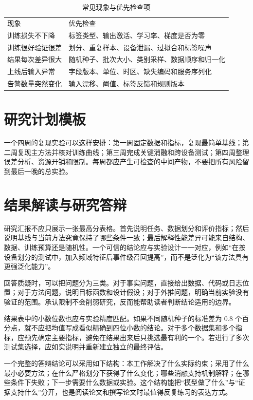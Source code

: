 \begin{table}[htbp]
\centering
\caption{常见现象与优先检查项}
\begin{tabular}{p{}p{}}
\toprule
现象 & 优先检查\\
训练损失不下降 & 标签类型、输出激活、学习率、梯度是否为零\\
训练很好验证很差 & 划分、重复样本、设备泄漏、过拟合和标签噪声\\
结果每次差异很大 & 随机种子、批次大小、类别采样、数据顺序和归一化\\
上线后输入异常 & 字段版本、单位、时区、缺失编码和服务序列化\\
告警数量突然变化 & 输入漂移、阈值、标签反馈和规则版本\\
\bottomrule
\end{tabular}
\end{table}

\section{研究计划模板}
一个四周的复现实验可以这样安排：第一周固定数据和指标，复现最简单基线；第二周复现主方法并核对训练曲线；第三周完成关键消融和跨设备测试；第四周整理误差分析、资源开销和限制。每周都应产生可检查的中间产物，不要把所有风险留到最后一晚的总实验。

\section{结果解读与研究答辩}
研究汇报不应只展示一张最高分表格。首先说明任务、数据划分和评价指标；然后说明基线与当前方法究竟保持了哪些条件一致；最后解释性能差异可能来自结构、数据、训练预算还是随机性。一个可信的结论应与实验设计一一对应，例如“在按设备划分的测试中，加入频域特征后事件级召回提高”，而不是泛化为“该方法具有更强泛化能力”。

回答质疑时，可以把问题分为三类。对于事实问题，直接给出数据、代码或日志位置；对于方法问题，说明目标函数和设计假设；对于外推问题，明确当前实验没有验证的范围。承认限制不会削弱研究，反而能帮助读者判断结论适用的边界。

结果表中的小数位数也应与实验精度匹配。如果不同随机种子的标准差为 $0.8$ 个百分点，就不应把均值写成看似精确到四位小数的结论。对于多个数据集和多个指标，应预先确定主要指标，避免在结果出来后只挑选最有利的一个。若进行了多次测试集选择，应如实说明并重新建立独立的最终评估。

一个完整的答辩结论可以采用如下结构：本工作解决了什么实际约束；采用了什么最小必要方法；在什么严格划分下获得了什么变化；哪些消融支持机制解释；在哪些条件下失败；下一步需要什么数据或实验。这个结构能把“模型做了什么”与“证据支持什么”分开，也是阅读论文和撰写论文时最值得反复练习的表达方式。